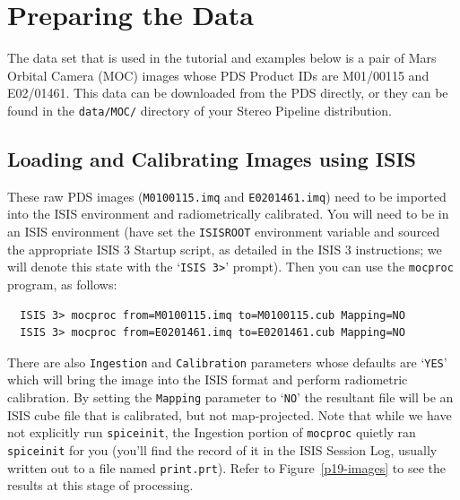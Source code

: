 \section{Preparing the Data}

The data set that is used in the tutorial and examples below is a
pair of Mars Orbital Camera (\ac{MOC}) \citep{1992JGR....97.7699M,2001JGR...10623429M}
images whose \ac{PDS} Product IDs are M01/00115 and E02/01461.
This data can be downloaded from the PDS directly, or they can be
found in the \texttt{data/MOC/} directory of your Stereo Pipeline distribution.

\subsection{Loading and Calibrating Images using ISIS}

These raw \ac{PDS} images (\texttt{M0100115.imq} and \texttt{E0201461.imq})
need to be imported into the \ac{ISIS} environment and radiometrically
calibrated.  You will need to be in an \ac{ISIS} environment (have
set the \texttt{ISISROOT} environment variable and sourced the
appropriate \ac{ISIS} 3 Startup script, as detailed in the \ac{ISIS}
3 instructions; we will denote this state with the `\texttt{ISIS
3>}' prompt).  Then you can use the \texttt{mocproc} program, as follows:

\begin{verbatim}
  ISIS 3> mocproc from=M0100115.imq to=M0100115.cub Mapping=NO
  ISIS 3> mocproc from=E0201461.imq to=E0201461.cub Mapping=NO
\end{verbatim}

There are also \texttt{Ingestion} and \texttt{Calibration} parameters
whose defaults are `\texttt{YES}' which will bring the image into the
\ac{ISIS} format and perform radiometric calibration.  By setting the
\texttt{Mapping} parameter to `\texttt{NO}' the resultant file will be
an \ac{ISIS} cube file that is calibrated, but not map-projected.
Note that while we have not explicitly run \texttt{spiceinit}, the
Ingestion portion of \texttt{mocproc} quietly ran \texttt{spiceinit}
for you (you'll find the record of it in the \ac{ISIS} Session Log,
usually written out to a file named \texttt{print.prt}).  Refer to
Figure~\ref{p19-images} to see the results at this stage of
processing.

